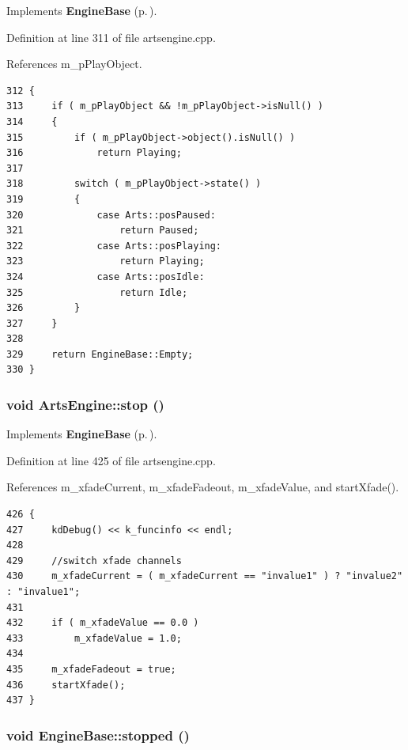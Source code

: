 Implements {\bf Engine\-Base} {\rm (p.\,\pageref{classEngineBase_EngineBasea8})}.

Definition at line 311 of file artsengine.cpp.

References m\_\-p\-Play\-Object.



\footnotesize\begin{verbatim}312 {
313     if ( m_pPlayObject && !m_pPlayObject->isNull() )
314     {
315         if ( m_pPlayObject->object().isNull() )
316             return Playing;
317 
318         switch ( m_pPlayObject->state() )
319         {
320             case Arts::posPaused:
321                 return Paused;
322             case Arts::posPlaying:
323                 return Playing;
324             case Arts::posIdle:
325                 return Idle;
326         }
327     }
328 
329     return EngineBase::Empty;
330 }
\end{verbatim}\normalsize 
{}
\subsubsection{\setlength{\rightskip}{0pt plus 5cm}void Arts\-Engine::stop ()\hspace{0.3cm}{\tt  [virtual, slot]}}\label{classArtsEngine_ArtsEnginei2}




Implements {\bf Engine\-Base} {\rm (p.\,\pageref{classEngineBase_EngineBasei2})}.

Definition at line 425 of file artsengine.cpp.

References m\_\-xfade\-Current, m\_\-xfade\-Fadeout, m\_\-xfade\-Value, and start\-Xfade().



\footnotesize\begin{verbatim}426 {
427     kdDebug() << k_funcinfo << endl;
428 
429     //switch xfade channels
430     m_xfadeCurrent = ( m_xfadeCurrent == "invalue1" ) ? "invalue2" : "invalue1";
431 
432     if ( m_xfadeValue == 0.0 )
433         m_xfadeValue = 1.0;
434 
435     m_xfadeFadeout = true;
436     startXfade();
437 }
\end{verbatim}\normalsize 
{}
\subsubsection{\setlength{\rightskip}{0pt plus 5cm}void Engine\-Base::stopped ()\hspace{0.3cm}{\tt  [signal, inherited]}}\label{classEngineBase_EngineBasel1}




